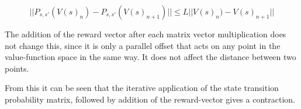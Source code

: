 $$
\vert \vert P_{s,s'}(V(s)_n) - P_{s,s'}(V(s)_{n+1}) \vert \vert \le L \vert \vert V(s)_n) - V(s)_{n+1} \vert \vert
$$

The addition of the reward vector after each matrix vector multiplication does not change this, since it is only a parallel offset that acts on any point in the value-function space in the same way. It does not affect the distance between two points.

From this it can be seen that the iterative application of the state transition probability matrix, followed by addition of the reward-vector gives a contraction.
